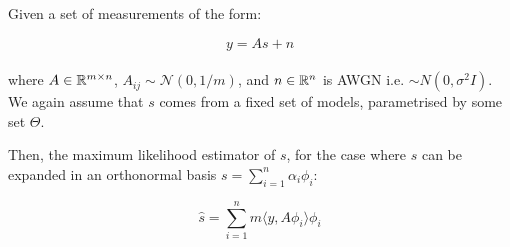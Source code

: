 \documentclass{article}
\begin{document}
\begin{theorem}

Given a set of measurements of the form:

\begin{equation}
y = As + n
\end{equation}
\\
where \(A \in {\mathbb{R}}^{m \times n} \), \(A_{ij} \sim \mathcal{N}\left(0,1/m\right)\), and \(n \in {\mathbb{R}}^n\) is AWGN i.e. \(\sim N\left(0, \sigma^2 I\right)\). We again assume that \(s\) comes from a fixed set of models, parametrised by some set \(\Theta\). 

Then, the maximum likelihood estimator of \(s\), for the case where \(s\) can be expanded in an orthonormal basis \(s = \sum_{i=1}^n \alpha_i\phi_i\):

\begin{equation}
\hat{s} = \sum_{i=1}^n m\langle y, A\phi_i\rangle \phi_i
\end{equation}

\end{theorem}
\end{document}
